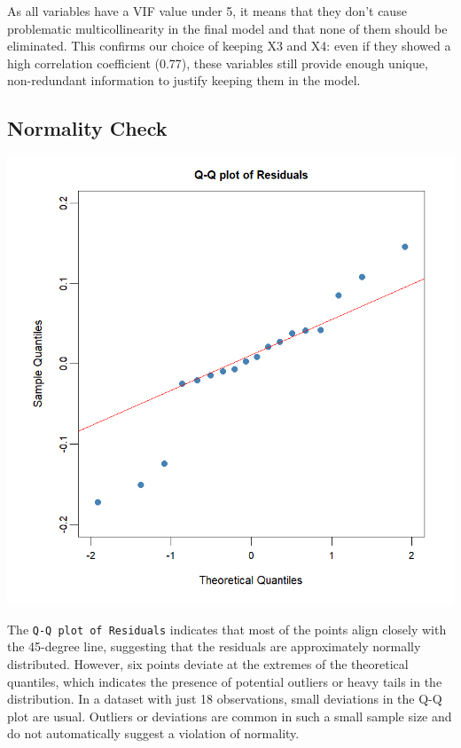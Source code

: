 \documentclass[
  11pt,
]{article}
\begin{document}
As all variables have a VIF value under 5, it means that they don't
cause problematic multicollinearity in the final model and that none of
them should be eliminated. This confirms our choice of keeping X3 and
X4: even if they showed a high correlation coefficient (0.77), these
variables still provide enough unique, non-redundant information to
justify keeping them in the model.

\subsection{Normality Check}\label{normality-check}

\begin{minipage}{0.45\textwidth}
\centering
\includegraphics[width=0.85\linewidth]{qqplot_residuals.png}
\end{minipage}
\hfill
\begin{minipage}{0.5\textwidth}
\small
The \texttt{Q-Q plot of Residuals} indicates that most of the points align closely with the 45-degree line, suggesting that the residuals are approximately normally distributed. However, six points deviate at the extremes of the theoretical quantiles, which indicates the presence of potential outliers or heavy tails in the distribution. In a dataset with just 18 observations, small deviations in the Q-Q plot are usual. Outliers or deviations are common in such a small sample size and do not automatically suggest a violation of normality.
\end{minipage}
\end{document}
